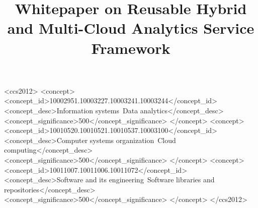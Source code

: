 \documentclass[sigconf,preprint]{acmart}
\begin{document}
\newpage

\title{Whitepaper on Reusable Hybrid and Multi-Cloud Analytics Service Framework}



\maketitle

\tableofcontents
\newpage






\begin{CCSXML}
<ccs2012>
   <concept>
       <concept_id>10002951.10003227.10003241.10003244</concept_id>
       <concept_desc>Information systems~Data analytics</concept_desc>
       <concept_significance>500</concept_significance>
       </concept>
   <concept>
       <concept_id>10010520.10010521.10010537.10003100</concept_id>
       <concept_desc>Computer systems organization~Cloud computing</concept_desc>
       <concept_significance>500</concept_significance>
       </concept>
   <concept>
       <concept_id>10011007.10011006.10011072</concept_id>
       <concept_desc>Software and its engineering~Software libraries and repositories</concept_desc>
       <concept_significance>500</concept_significance>
       </concept>
 </ccs2012>
\end{CCSXML}











\newpage

\maketitle

% 








\end{document}
